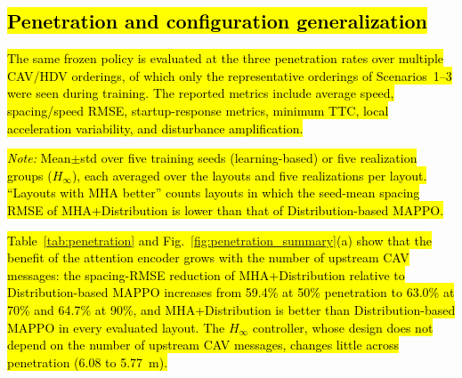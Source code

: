 \documentclass{ieeeaccess}
\begin{document}
\subsection{\hl{Penetration and configuration generalization}}
\label{sec:penetration_generalization}

\hl{The same frozen policy is evaluated at the three penetration rates over multiple CAV/HDV orderings, of which only the representative orderings of Scenarios~1--3 were seen during training. The reported metrics include average speed, spacing/speed RMSE, startup-response metrics, minimum TTC, local acceleration variability, and disturbance amplification.}

\begin{table}[htbp]
\centering
\caption{\hl{Spacing RMSE (m) Across CAV Penetration Rates (30\% Bernoulli Loss, Averaged over Layouts)}}
\label{tab:penetration}
\setlength{\tabcolsep}{4pt}
\renewcommand{\arraystretch}{1.2}

\vspace{0.2cm}
{\raggedright
\footnotesize
\hl{\textit{Note:} Mean$\pm$std over five training seeds (learning-based) or five realization groups ($H_\infty$), each averaged over the layouts and five realizations per layout. ``Layouts with MHA better'' counts layouts in which the seed-mean spacing RMSE of MHA+Distribution is lower than that of Distribution-based MAPPO.}
\par}
\end{table}

\hl{Table~\ref{tab:penetration} and Fig.~\ref{fig:penetration_summary}(a) show that the benefit of the attention encoder grows with the number of upstream CAV messages: the spacing-RMSE reduction of MHA+Distribution relative to Distribution-based MAPPO increases from 59.4\% at 50\% penetration to 63.0\% at 70\% and 64.7\% at 90\%, and MHA+Distribution is better than Distribution-based MAPPO in every evaluated layout. The $H_\infty$ controller, whose design does not depend on the number of upstream CAV messages, changes little across penetration (6.08 to 5.77~m).} %
\end{document}
